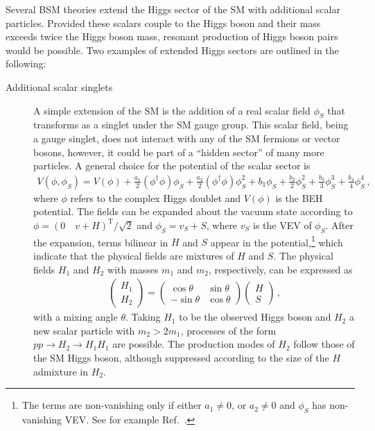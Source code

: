 Several BSM theories extend the Higgs sector of the SM with additional scalar
particles. Provided these scalars couple to the Higgs boson and their mass
exceeds twice the Higgs boson mass, resonant production of Higgs boson pairs
would be possible. Two examples of extended Higgs sectors are outlined in the
following:
\begin{description}

\item[Additional scalar singlets] A simple extension of the SM is the addition
  of a real scalar field $\phi_{S}$ that transforms as a singlet under the SM
  gauge group. This scalar field, being a gauge singlet, does not interact with
  any of the SM fermions or vector bosons, however, it could be part of a
  ``hidden sector'' of many more particles. A general choice for the potential
  of the scalar sector is~\cite{Chen:2014ask,DiMicco:2019ngk}
  \begin{align*}
    V(\phi, \phi_{S}) = V(\phi)
    + \frac{a_1}{2} (\phi^\dagger \phi) \phi_{S}
    + \frac{a_2}{2} (\phi^\dagger \phi) \phi_{S}^2
    + b_1 \phi_{S} + \frac{b_2}{2} \phi_{S}^2 + \frac{b_3}{3} \phi_{S}^3 + \frac{b_4}{4} \phi_{S}^4 \,\text{,}
  \end{align*}
  where $\phi$ refers to the complex Higgs doublet and $V(\phi)$ is the BEH
  potential. The fields can be expanded about the vacuum state according to
  $\phi = (0 \quad v + H)^{\text{T}} / \sqrt{2}$ and $\phi_{S} = v_{S} + S$,
  where $v_{S}$ is the VEV of $\phi_{S}$. After the expansion, terms bilinear in
  $H$ and $S$ appear in the potential,\footnote{The terms are non-vanishing only
    if either $a_1 \neq 0$, or $a_2 \neq 0$ and $\phi_{S}$ has non-vanishing
    VEV. See for example Ref.~\cite{Chen:2014ask}.} which indicate that the
  physical fields are mixtures of $H$ and $S$. The physical fields $H_1$ and
  $H_2$ with masses $m_1$ and $m_2$, respectively, can be expressed as
  \begin{align*}
    \begin{pmatrix}
      H_1 \\
      H_2
    \end{pmatrix}
    =
    \begin{pmatrix}
      \cos\theta & \sin\theta \\
      -\sin\theta & \cos\theta
    \end{pmatrix}
    \begin{pmatrix}
      H \\
      S
    \end{pmatrix} \,\text{,}
  \end{align*}
  with a mixing angle $\theta$. Taking $H_1$ to be the observed Higgs boson and
  $H_2$ a new scalar particle with $m_2 > 2 m_1$, processes of the form
  $pp \to H_2 \to H_1 H_1$ are possible. The production modes of $H_2$ follow
  those of the SM Higgs boson, although suppressed according to the size of the
  $H$ admixture in $H_2$.


\end{description}
